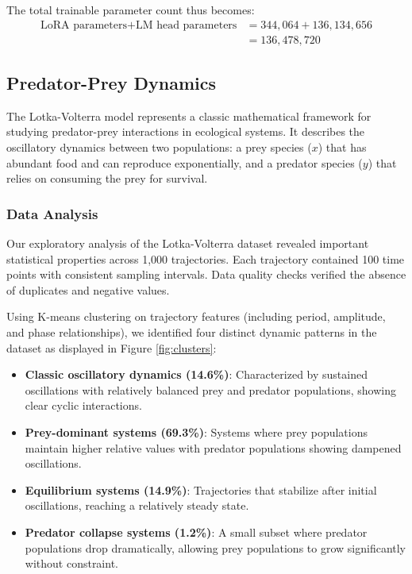 \documentclass{article}
\begin{document}
The total trainable parameter count thus becomes:
\begin{align}
\text{LoRA parameters} + \text{LM head parameters} &= 344,064 + 136,134,656\\
&= 136,478,720
\end{align}

\subsection*{Predator-Prey Dynamics}

The Lotka-Volterra model represents a classic mathematical framework for studying predator-prey interactions in ecological systems. It describes the oscillatory dynamics between two populations: a prey species ($x$) that has abundant food and can reproduce exponentially, and a predator species ($y$) that relies on consuming the prey for survival.

\subsubsection*{Data Analysis}

Our exploratory analysis of the Lotka-Volterra dataset revealed important statistical properties across 1,000 trajectories. Each trajectory contained 100 time points with consistent sampling intervals. Data quality checks verified the absence of duplicates and negative values. 

Using K-means clustering on trajectory features (including period, amplitude, and phase relationships), we identified four distinct dynamic patterns in the dataset as displayed in Figure \ref{fig:clusters}:

\begin{itemize}
\item \textbf{Classic oscillatory dynamics (14.6\%)}: Characterized by sustained oscillations with relatively balanced prey and predator populations, showing clear cyclic interactions.
\item \textbf{Prey-dominant systems (69.3\%)}: Systems where prey populations maintain higher relative values with predator populations showing dampened oscillations.
\item \textbf{Equilibrium systems (14.9\%)}: Trajectories that stabilize after initial oscillations, reaching a relatively steady state.
\item \textbf{Predator collapse systems (1.2\%)}: A small subset where predator populations drop dramatically, allowing prey populations to grow significantly without constraint.
\end{itemize}
\end{document}
